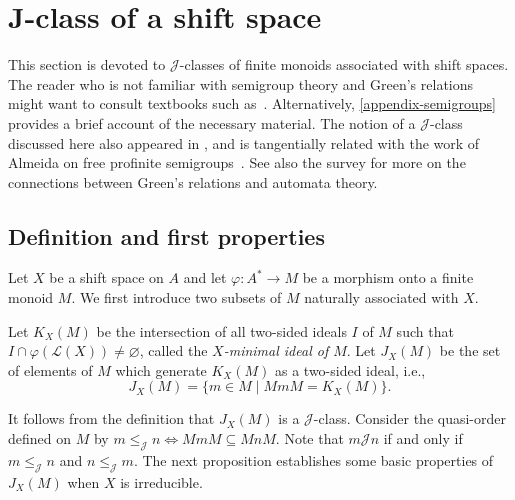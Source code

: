 \documentclass[a4paper,UKenglish,numberwithinsect,cleveref]{lipics-v2021}
\newcommand{\JJ}{\mathrel{\mathscr{J}}}
\newcommand{\cL}{\mathcal L}
\begin{document}
\section{J-class of a shift space}
\label{sec:Jclass}

This section is devoted to $\JJ$-classes of finite monoids associated with shift spaces. The reader who is not familiar with semigroup theory and Green's relations might want to consult textbooks such as~\cite{BerstelPerrinReutenauer2009,book/Lallement1979,book/Grillet1995,book/Howie1995,Eilenberg1974,Eilenberg1976}.
Alternatively, \cref{appendix-semigroups} provides a brief account of the necessary material.
The notion of a $\JJ$-class discussed here also appeared in \cite{Perrin2015,PerrinSchupp1986}, and is tangentially related with the work of Almeida on free profinite semigroups~\cite{Almeida2005}. See also the survey \cite{Colcombet2011} for more on the connections between Green's relations and automata theory.

\subsection{Definition and first properties}

Let $X$ be a shift space on $A$ and let $\varphi\colon A^*\to M$ be a morphism onto a finite monoid $M$. We first introduce two subsets of $M$ naturally associated with $X$. 

\begin{definition}
    Let $K_X(M)$ be the intersection of all two-sided ideals $I$ of $M$ such that $I\cap\varphi(\cL(X))\neq\varnothing$, called the \emph{$X$-minimal ideal of $M$}. Let $J_X(M)$ be the set of elements of $M$ which generate $K_X(M)$ as a two-sided ideal, i.e., 
    \begin{equation*}
        J_X(M) = \{ m\in M \mid MmM = K_X(M)\}.
    \end{equation*}
\end{definition}

It follows from the definition that $J_X(M)$ is a $\JJ$-class. Consider the quasi-order defined on $M$ by $m\leq_{\JJ} n\iff MmM\subseteq MnM$. Note that $m\JJ n$ if and only if $m\leq_{\JJ} n$ and $n\leq_{\JJ} m$. The next proposition establishes some basic properties of $J_X(M)$ when $X$ is irreducible.
\end{document}
